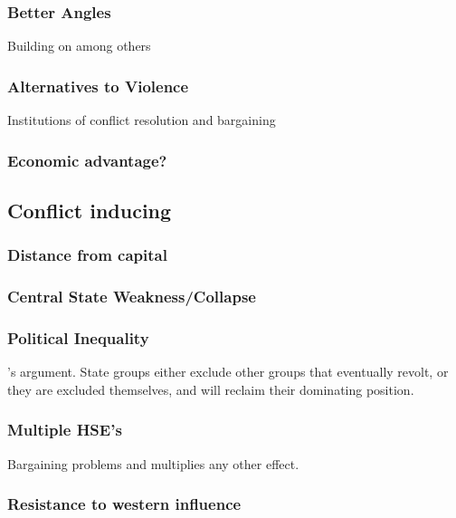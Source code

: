 \documentclass[12pt]{article}
\begin{document}
\subsubsection{Better Angles}

Building on among others \citet{Tilly1990} 

\subsubsection{Alternatives to Violence}

Institutions of conflict resolution and bargaining

\subsubsection{Economic advantage?}

\subsection{Conflict inducing}

\subsubsection{Distance from capital}

\subsubsection{Central State Weakness/Collapse}

\subsubsection{Political Inequality}

\citet{Paine2019}'s argument. State groups either exclude other groups that
eventually revolt, or they are excluded themselves, and will reclaim their
dominating position.

\subsubsection{Multiple HSE's}

Bargaining problems and multiplies any other effect.

\subsubsection{Resistance to western influence}
\end{document}
